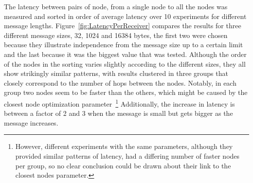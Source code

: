 The latency between pairs of node, from a single node to all the nodes was measured and sorted in order of average latency over 10 experiments for different message lengths. Figure~\ref{fig:LatencyPerReceiver} compares the results for three different message sizes, 32, 1024 and 16384 bytes, the first two were chosen because they illustrate independence from the message size up to a certain limit and the last because it was the biggest value that was tested. Although the order of the nodes in the sorting varies slightly according to the different sizes, they all show strikingly similar patterns, with results clustered in three groups that closely correspond to the number of hops between the nodes. Notably, in each group two nodes seem to be faster than the others, which might be caused by the closest node optimization parameter~\footnote{However, different experiments with the same parameters, although they provided similar patterns of latency, had a differing number of faster nodes per group, so no clear conclusion could be drawn about their link to the closest nodes parameter.} Additionally, the increase in latency is between a factor of 2 and 3 when the message is small but gets bigger as the message increases.



